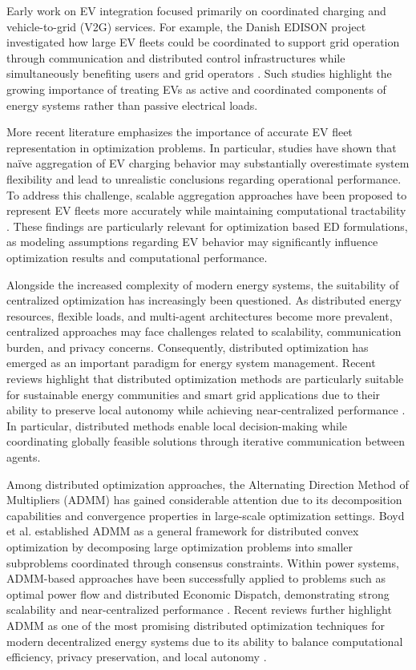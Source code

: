 \documentclass[12pt, a4paper]{article}
\begin{document}
Early work on EV integration focused primarily on coordinated charging and vehicle-to-grid (V2G) services. For example, the Danish EDISON project investigated how large EV fleets could be coordinated to support grid operation through communication and distributed control infrastructures while simultaneously benefiting users and grid operators \parencite{Andersen2010}. Such studies highlight the growing importance of treating EVs as active and coordinated components of energy systems rather than passive electrical loads.

More recent literature emphasizes the importance of accurate EV fleet representation in optimization problems. In particular, studies have shown that naïve aggregation of EV charging behavior may substantially overestimate system flexibility and lead to unrealistic conclusions regarding operational performance. To address this challenge, scalable aggregation approaches have been proposed to represent EV fleets more accurately while maintaining computational tractability \parencite{Muessel2023}. These findings are particularly relevant for optimization based ED formulations, as modeling assumptions regarding EV behavior may significantly influence optimization results and computational performance.

Alongside the increased complexity of modern energy systems, the suitability of centralized optimization has increasingly been questioned. As distributed energy resources, flexible loads, and multi-agent architectures become more prevalent, centralized approaches may face challenges related to scalability, communication burden, and privacy concerns. Consequently, distributed optimization has emerged as an important paradigm for energy system management. Recent reviews highlight that distributed optimization methods are particularly suitable for sustainable energy communities and smart grid applications due to their ability to preserve local autonomy while achieving near-centralized performance \parencite{Basaran2026}. In particular, distributed methods enable local decision-making while coordinating globally feasible solutions through iterative communication between agents.

Among distributed optimization approaches, the Alternating Direction Method of Multipliers (ADMM) has gained considerable attention due to its decomposition capabilities and convergence properties in large-scale optimization settings. Boyd et al. \parencite{Boyd2011} established ADMM as a general framework for distributed convex optimization by decomposing large optimization problems into smaller subproblems coordinated through consensus constraints. Within power systems, ADMM-based approaches have been successfully applied to problems such as optimal power flow and distributed Economic Dispatch, demonstrating strong scalability and near-centralized performance \parencite{Erseghe2014, Wasti2020}. Recent reviews further highlight ADMM as one of the most promising distributed optimization techniques for modern decentralized energy systems due to its ability to balance computational efficiency, privacy preservation, and local autonomy \parencite{Basaran2026, Sun2025}.
\end{document}
